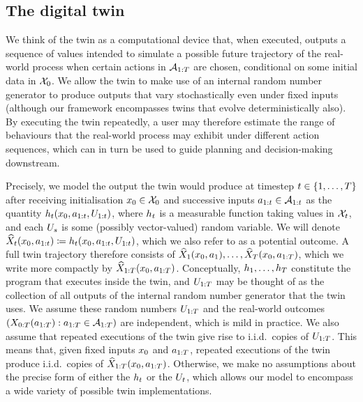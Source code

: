 %


\subsection{The digital twin}

We think of the twin as a computational device that, when executed, outputs a sequence of values intended to simulate a possible future trajectory of the real-world process when certain actions in $\mathcal{A}_{1:T}$ are chosen, conditional on some initial data in $\mathcal{X}_0$.
We allow the twin to make use of an internal random number generator to produce outputs that vary stochastically even under fixed inputs (although our framework encompasses twins that evolve deterministically also).
By executing the twin repeatedly, a user may therefore estimate the range of behaviours that the real-world process may exhibit under different action sequences, which can in turn be used to guide planning and decision-making downstream.

Precisely, we model the output the twin would produce at timestep $t \in \{1, \ldots, T\}$ after receiving initialisation $x_0 \in \mathcal{X}_0$ and successive inputs $a_{1:t} \in \mathcal{A}_{1:t}$ as the quantity $h_t(x_0, a_{1:t}, U_{1:t})$, where $h_t$ is a measurable function taking values in $\mathcal{X}_{t}$, and each $U_s$ is some (possibly vector-valued) random variable.
We will denote $\widehat{X}_{t}(x_0, a_{1:t}) \coloneqq h_t(x_0, a_{1:t}, U_{1:t})$, which we also refer to as a potential outcome.
%
%
A full twin trajectory therefore consists of $\widehat{X}_1(x_0, a_1), \ldots, \widehat{X}_T(x_0, a_{1:T})$, which we write more compactly by $\widehat{X}_{1:T}(x_0, a_{1:T})$.
%
Conceptually, $h_1, \ldots, h_T$ constitute the program that executes inside the twin, and $U_{1:T}$ may be thought of as the collection of all outputs of the internal random number generator that the twin uses.
%
We assume these random numbers $U_{1:T}$ and the real-world outcomes $(X_{0:T}(a_{1:T}) : a_{1:T} \in \mathcal{A}_{1:T})$ are independent, which is mild in practice.
We also assume that repeated executions of the twin give rise to i.i.d.\ copies of $U_{1:T}$.
This means that, given fixed inputs $x_0$ and $a_{1:T}$, repeated executions of the twin produce i.i.d.\ copies of $\widehat{X}_{1:T}(x_0, a_{1:T})$.
Otherwise, we make no assumptions about the precise form of either the $h_t$ or the $U_t$, which allows our model to encompass a wide variety of possible twin implementations.


